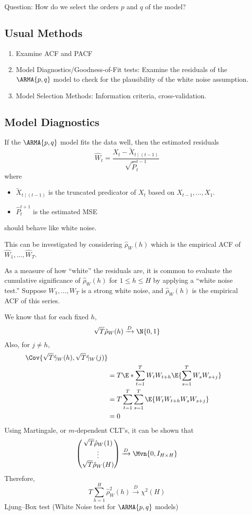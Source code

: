 Question: How do we select the orders $ p $ and $ q $ of the model?
\subsection*{Usual Methods}
\begin{enumerate}[(1)]
    \item Examine ACF and PACF
    \item Model Diagnostics/Goodness-of-Fit tests:
          Examine the residuals of the $ \ARMA{p,q} $ model to check for the plausibility
          of the white noise assumption.
    \item Model Selection Methods: Information criteria, cross-validation.
\end{enumerate}
\subsection*{Model Diagnostics}
If the $ \ARMA{p,q} $ model fits the data well, then the estimated residuals
\[ \hat{W}_{t}=\frac{X_t-\tilde{X}_{t\mid (t-1)}}{\sqrt{\tilde{P}}_{t}^{t-1}}  \]
where
\begin{itemize}
    \item $ \tilde{X}_{t\mid(t-1)} $ is the truncated predicator of $ X_t $
          based on $ X_{t-1},\ldots,X_1 $.
    \item $ \hat{P}_t^{t+1} $ is the estimated MSE
\end{itemize}
should behave like white noise.

This can be investigated by considering
$ \hat{\rho}_W(h) $
which is the empirical ACF of $ \hat{W}_1,\ldots,\hat{W}_T $.

As a measure of how ``white'' the residuals are, it is common
to evaluate the cumulative significance of $ \hat{\rho}_W(h) $
for $ 1\le h\le H $ by applying a ``white noise test.''
Suppose $ W_1,\ldots,W_T $ is a strong white noise, and
$ \hat{\rho}_W(h) $ is the empirical ACF of this series.

We know that for each fixed $ h $,
\[ \sqrt{T}\hat{\rho}_W(h)\xrightarrow{D}\N{0,1} \]
Also, for $ j\ne h $,
\begin{align*}
    \Cov{\sqrt{T}\hat{\gamma}_W(h),\sqrt{T}\hat{\gamma}_W(j)}          \\
     & =T\E*{\sum_{t=1}^{T} W_t W_{t+h}}\E{\sum_{s=1}^{T} W_s W_{s+j}} \\
     & =T \sum_{t=1}^{T} \sum_{s=1}^{T} \E{W_{t}W_{t+h}W_{s}W_{s+j}}   \\
     & =0
\end{align*}
Using Martingale, or $ m $-dependent CLT's, it can be shown that
\[ \begin{pmatrix}
        \sqrt{T}\hat{\rho}_W(1) \\
        \vdots                  \\
        \sqrt{T}\hat{\rho}_W(H)
    \end{pmatrix}
    \xrightarrow{D} \Mvn{0,I_{H\times H}} \]
Therefore,
\[ T \sum_{h=1}^{H} \hat{\rho}_W^2(h)
    \xrightarrow{D}\chi^2(H) \]
Ljung–Box test (White Noise test for $ \ARMA{p,q} $ models)

